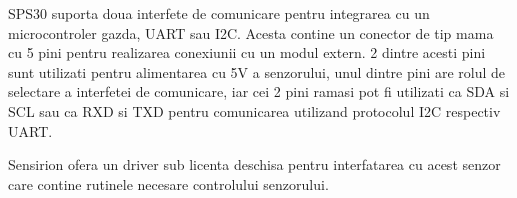 SPS30 suporta doua interfete de comunicare pentru integrarea cu un microcontroler gazda, UART sau I2C. Acesta contine un conector de tip mama cu 5 pini pentru realizarea 
conexiunii cu un modul extern. 2 dintre acesti pini sunt utilizati pentru alimentarea cu 5V a senzorului, unul dintre pini are rolul de selectare a interfetei de comunicare, 
iar cei 2 pini ramasi pot fi utilizati ca SDA si SCL sau ca RXD si TXD pentru comunicarea utilizand protocolul I2C respectiv UART.

Sensirion ofera un driver sub licenta deschisa pentru interfatarea cu acest senzor care contine rutinele necesare controlului senzorului.

